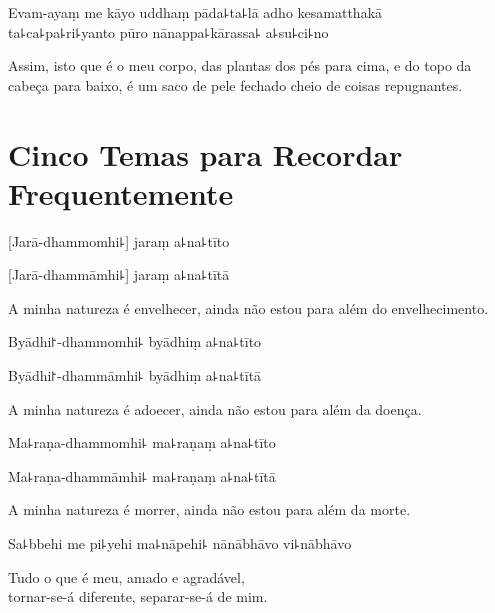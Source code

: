 Evam-ayaṃ me kāyo uddhaṃ pāda꜕ta꜕lā adho kesamatthakā\\
ta꜕ca꜕pa꜕ri꜕yanto pūro nānappa꜕kārassa꜕ a꜕su꜕ci꜕no

\begin{english}
  Assim, isto que é o meu corpo, das plantas dos pés para cima, e do topo da cabeça para baixo, é um saco de pele fechado cheio de coisas repugnantes.
\end{english}

\chapter[Cinco Temas]{Cinco Temas para Recordar Frequentemente}


\begin{leader}
\end{leader}

%
[Jarā-dhammomhi꜕] jaraṃ a꜕na꜕tīto

%
[Jarā-dhammāmhi꜕] jaraṃ a꜕na꜕tītā

\begin{english}
  A minha natureza é envelhecer, ainda não estou para além do envelhecimento.
\end{english}

%
Byādhi꜓-dhammomhi꜕ byādhiṃ a꜕na꜕tīto

%
Byādhi꜓-dhammāmhi꜕ byādhiṃ a꜕na꜕tītā

\begin{english}
  A minha natureza é adoecer, ainda não estou para além da doença.
\end{english}

%
Ma꜕raṇa-dhammomhi꜕ ma꜕raṇaṃ a꜕na꜕tīto

%
Ma꜕raṇa-dhammāmhi꜕ ma꜕raṇaṃ a꜕na꜕tītā

\begin{english}
  A minha natureza é morrer, ainda não estou para além da morte.
\end{english}

Sa꜕bbehi me pi꜕yehi ma꜕nāpehi꜕ nānābhāvo vi꜕nābhāvo

\begin{english}
  Tudo o que é meu, amado e agradável,\\
  tornar-se-á diferente, separar-se-á de mim.
\end{english}


